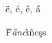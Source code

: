 \documentclass{article}
\begin{document}
\"e, \'e, \^e, \H{a}

\"F\textsl{\H{a}nc}\^{\i}\~ne\c{s}s
\end{document}
